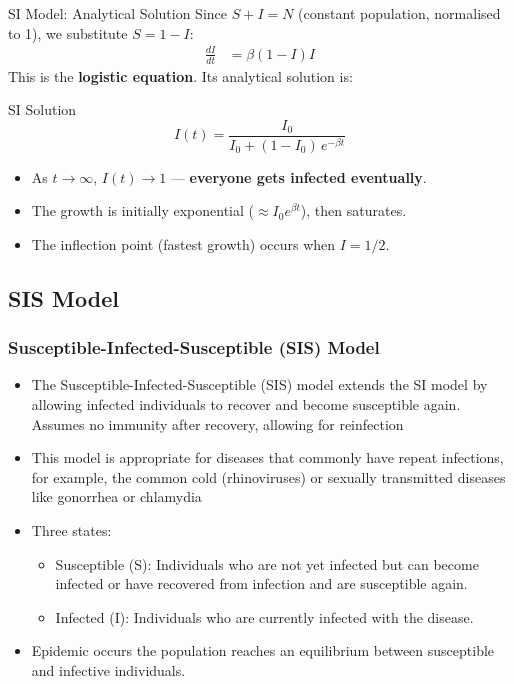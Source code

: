 \begin{frame}{SI Model: Analytical Solution}
\small
Since $S + I = N$ (constant population, normalised to 1), we substitute $S = 1 - I$:
  \begin{align*}
    \frac{dI}{dt} &= \beta (1 - I) I
  \end{align*}
This is the \textbf{logistic equation}. Its analytical solution is:
  \begin{block}{SI Solution}
    \[
      I(t) = \frac{I_0}{I_0 + (1 - I_0)\,e^{-\beta t}}
    \]
  \end{block}
  \vfill
  \begin{itemize}
    \item As $t \to \infty$, $I(t) \to 1$ --- \textbf{everyone gets infected eventually}.
    \item The growth is initially exponential ($\approx I_0 e^{\beta t}$), then saturates.
    \item The inflection point (fastest growth) occurs when $I = 1/2$.
  \end{itemize}
\end{frame}


\subsection{SIS Model}
\begin{frame}
  \frametitle{Susceptible-Infected-Susceptible (SIS) Model}
  \begin{itemize}
    \item The Susceptible-Infected-Susceptible (SIS) model extends the SI model by allowing infected individuals to recover and become susceptible again. Assumes no immunity after recovery, allowing for reinfection
    \item  This model is appropriate for diseases that commonly have repeat infections, for example, the common cold (rhinoviruses) or sexually transmitted diseases like gonorrhea or chlamydia
    \item Three states: 
    \begin{itemize}
        \item Susceptible (S): Individuals who are not yet infected but can become infected or have recovered from infection and are susceptible again.
        \item Infected (I): Individuals who are currently infected with the disease.
    \end{itemize}
    \item Epidemic occurs the population reaches an equilibrium between susceptible and infective individuals.
  \end{itemize}
\end{frame}

